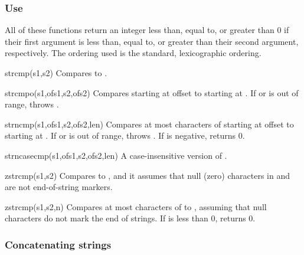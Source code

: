 \subsubsection*{Use}

All of these functions return an integer less than, equal to, or greater
than 0 if their first argument is less than, equal to, or greater than
their second argument, respectively.  The ordering used is the standard,
lexicographic ordering.

\begin{defun}{strcmp}{(s1,s2)}
Compares  to .
\end{defun}

\begin{defun}{strcmpo}{(s1,ofs1,s2,ofs2)}
Compares  starting at offset  to  starting at
.  If  or  is out of range, 
throws .
\end{defun}

\begin{defun}{strncmp}{(s1,ofs1,s2,ofs2,len)}
Compares at most  characters of  starting at offset
 to  starting at .  If  or
 is out of range,  throws
.  If  is negative,
 returns 0.
\end{defun}

\begin{defun}{strncasecmp}{(s1,ofs1,s2,ofs2,len)}
A case-insensitive version of .
\end{defun}

\begin{defun}{zstrcmp}{(s1,s2)}
Compares  to , and it assumes that null (zero)
characters in  and  are not end-of-string markers.
\end{defun}

\begin{defun}{zstrcmp}{(s1,s2,n)}
Compares at most  characters of  to , assuming
that null characters do not mark the end of strings.  If  is less
than 0,  returns 0.
\end{defun}

\subsubsection*{Concatenating strings}
